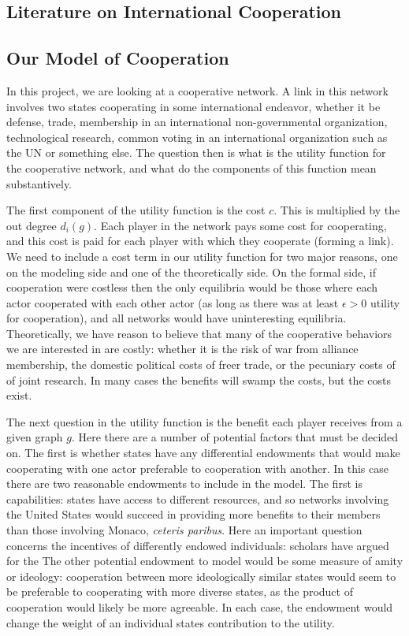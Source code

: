 \documentclass[12pt,onesided,fullpage]{amsart}
\begin{document}
\subsection{Literature on International Cooperation}
\subsection{Our Model of Cooperation}
In this project, we are looking at a cooperative network. A link in this network involves two states cooperating in some international endeavor, whether it be defense, trade, membership in an international non-governmental organization, technological research, common voting in an international organization such as the UN or something else. The question then is what is the utility function for the cooperative network, and what do the components of this function mean substantively.

The first component of the utility function is the cost $c$. This is multiplied by the out degree $d_{i}(g)$. Each player in the network pays some cost for cooperating, and this cost is paid for each player with which they cooperate (forming a link). We need to include a cost term in our utility function for two major reasons, one on the modeling side and one of the theoretically side. On the formal side, if cooperation were costless then the only equilibria would be those where each actor cooperated with each other actor (as long as there was at least $\epsilon>0$ utility for cooperation), and all networks would have uninteresting equilibria. Theoretically, we have reason to believe that many of the cooperative behaviors we are interested in are costly: whether it is the risk of war from alliance membership, the domestic political costs of freer trade, or the pecuniary costs of of joint research. In many cases the benefits will swamp the costs, but the costs exist.

The next question in the utility function is the benefit each player receives from a given graph $g$. Here there are a number of potential factors that must be decided on. The first is whether states have any differential endowments that would make cooperating with one actor preferable to cooperation with another. In this case there are two reasonable endowments to include in the model. The first is capabilities: states have access to different resources, and so networks involving the United States would succeed in providing more benefits to their members than those involving Monaco, \emph{ceteris paribus}. Here an important question concerns the incentives of differently endowed individuals: scholars have argued for the  The other potential endowment to model would be some measure of amity or ideology: cooperation between more ideologically similar states would seem to be preferable to cooperating with more diverse states, as the product of cooperation would likely be more agreeable. In each case, the endowment would change the weight of an individual states contribution to the utility. 
\end{document}
